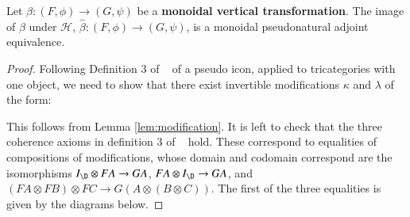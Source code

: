 \documentclass{amsart}
\begin{document}
\begin{lem}\label{lem:montran}
Let $\beta: (F, \phi) \rightarrow (G,\psi)$ be a {\bf monoidal vertical transformation}. The image of $\beta$ under $\mathcal{H}$, $\hat{\beta}: (F, \phi) \rightarrow (G,\psi)$, is a monoidal pseudonatural adjoint equivalence.
\end{lem}

\begin{proof}
Following Definition 3 of ~\cite{gg:ldstr-tricat} of a pseudo icon, applied to tricategories with one object, we need to show that there exist invertible modifications $\kappa$ and $\lambda$ of the form:

\hspace{1cm}

This follows from Lemma \ref{lem:modification}. 
It is left to check that the three coherence axioms in definition 3 of ~\cite{gg:ldstr-tricat} hold. These correspond to equalities of compositions of modifications, whose domain and codomain correspond are the isomorphisms $I_{\D} \otimes FA \rightarrow GA$, $FA \otimes I_{\D} \rightarrow GA$, and $(FA \otimes FB) \otimes FC \rightarrow G(A \otimes (B \otimes C))$.
The first of the three equalities is given by the diagrams below.


\end{proof}
\end{document}
